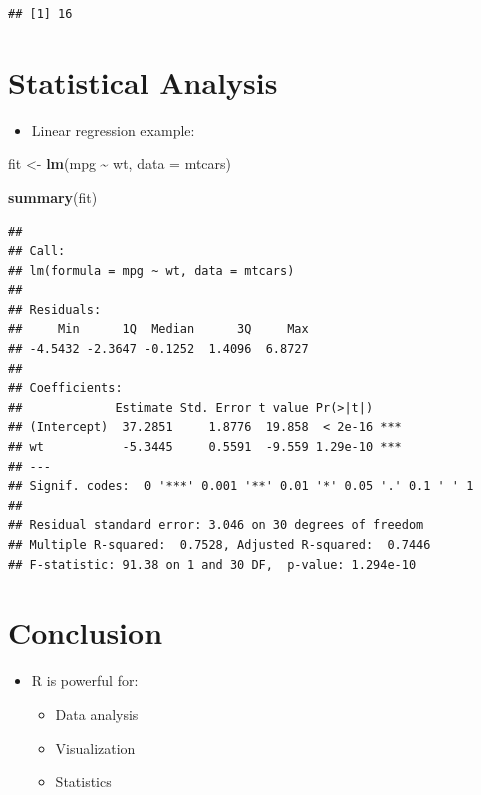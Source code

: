 \documentclass[
]{book}
\newenvironment{Shaded}{\begin{snugshade}}{\end{snugshade}}
\newcommand{\AttributeTok}[1]{\textcolor[rgb]{0.13,0.29,0.53}{#1}}
\newcommand{\FunctionTok}[1]{\textcolor[rgb]{0.13,0.29,0.53}{\textbf{#1}}}
\newcommand{\NormalTok}[1]{#1}
\newcommand{\OtherTok}[1]{\textcolor[rgb]{0.56,0.35,0.01}{#1}}
\newcommand{\SpecialCharTok}[1]{\textcolor[rgb]{0.81,0.36,0.00}{\textbf{#1}}}
\providecommand{\tightlist}{%
  \setlength{\itemsep}{0pt}\setlength{\parskip}{0pt}}
\begin{document}
\begin{verbatim}
## [1] 16
\end{verbatim}

\hypertarget{statistical-analysis}{%
\section{Statistical Analysis}\label{statistical-analysis}}

\begin{itemize}
\tightlist
\item
  Linear regression example:
\end{itemize}

\begin{Shaded}
\begin{Highlighting}[]
\NormalTok{fit }\OtherTok{\textless{}{-}} \FunctionTok{lm}\NormalTok{(mpg }\SpecialCharTok{\textasciitilde{}}\NormalTok{ wt, }\AttributeTok{data =}\NormalTok{ mtcars)}
\end{Highlighting}
\end{Shaded}

\begin{Shaded}
\begin{Highlighting}[]
\FunctionTok{summary}\NormalTok{(fit)}
\end{Highlighting}
\end{Shaded}

\begin{verbatim}
## 
## Call:
## lm(formula = mpg ~ wt, data = mtcars)
## 
## Residuals:
##     Min      1Q  Median      3Q     Max 
## -4.5432 -2.3647 -0.1252  1.4096  6.8727 
## 
## Coefficients:
##             Estimate Std. Error t value Pr(>|t|)    
## (Intercept)  37.2851     1.8776  19.858  < 2e-16 ***
## wt           -5.3445     0.5591  -9.559 1.29e-10 ***
## ---
## Signif. codes:  0 '***' 0.001 '**' 0.01 '*' 0.05 '.' 0.1 ' ' 1
## 
## Residual standard error: 3.046 on 30 degrees of freedom
## Multiple R-squared:  0.7528, Adjusted R-squared:  0.7446 
## F-statistic: 91.38 on 1 and 30 DF,  p-value: 1.294e-10
\end{verbatim}

\hypertarget{conclusion}{%
\section{Conclusion}\label{conclusion}}

\begin{itemize}
\tightlist
\item
  R is powerful for:

  \begin{itemize}
  \tightlist
  \item
    Data analysis
  \item
    Visualization
  \item
    Statistics
  \end{itemize}
\end{itemize}
\end{document}
